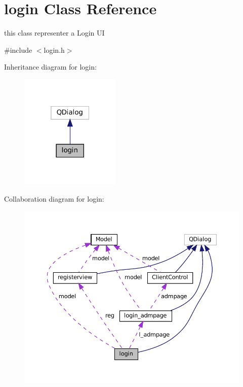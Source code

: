 \hypertarget{classlogin}{}\section{login Class Reference}
\label{classlogin}


this class representer a Login UI  




{\ttfamily \#include $<$login.\+h$>$}



Inheritance diagram for login\+:\nopagebreak
\begin{figure}[H]
\begin{center}
\leavevmode
\includegraphics[width=136pt]{classlogin__inherit__graph}
\end{center}
\end{figure}


Collaboration diagram for login\+:\nopagebreak
\begin{figure}[H]
\begin{center}
\leavevmode
\includegraphics[width=350pt]{classlogin__coll__graph}
\end{center}
\end{figure}
